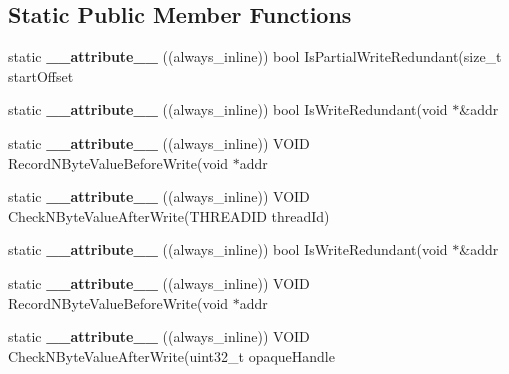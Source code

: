 \subsection*{Static Public Member Functions}
\begin{DoxyCompactItemize}
\item 
\hypertarget{structRedSpyAnalysis_acb8312eee9deb99291c4052fdbd66887}{static {\bfseries \-\_\-\-\_\-attribute\-\_\-\-\_\-} ((always\-\_\-inline)) bool Is\-Partial\-Write\-Redundant(size\-\_\-t start\-Offset}\label{structRedSpyAnalysis_acb8312eee9deb99291c4052fdbd66887}

\item 
\hypertarget{structRedSpyAnalysis_a7535fac0a0e053e60b39fa2f23b3701f}{static {\bfseries \-\_\-\-\_\-attribute\-\_\-\-\_\-} ((always\-\_\-inline)) bool Is\-Write\-Redundant(void $\ast$\&addr}\label{structRedSpyAnalysis_a7535fac0a0e053e60b39fa2f23b3701f}

\item 
\hypertarget{structRedSpyAnalysis_ad09b31fd6c23d44ab50798a11711fb1a}{static {\bfseries \-\_\-\-\_\-attribute\-\_\-\-\_\-} ((always\-\_\-inline)) V\-O\-I\-D Record\-N\-Byte\-Value\-Before\-Write(void $\ast$addr}\label{structRedSpyAnalysis_ad09b31fd6c23d44ab50798a11711fb1a}

\item 
\hypertarget{structRedSpyAnalysis_acd89ba949f9f73d9bba3bf8c0c057f90}{static {\bfseries \-\_\-\-\_\-attribute\-\_\-\-\_\-} ((always\-\_\-inline)) V\-O\-I\-D Check\-N\-Byte\-Value\-After\-Write(T\-H\-R\-E\-A\-D\-I\-D thread\-Id)}\label{structRedSpyAnalysis_acd89ba949f9f73d9bba3bf8c0c057f90}

\item 
\hypertarget{structRedSpyAnalysis_a7535fac0a0e053e60b39fa2f23b3701f}{static {\bfseries \-\_\-\-\_\-attribute\-\_\-\-\_\-} ((always\-\_\-inline)) bool Is\-Write\-Redundant(void $\ast$\&addr}\label{structRedSpyAnalysis_a7535fac0a0e053e60b39fa2f23b3701f}

\item 
\hypertarget{structRedSpyAnalysis_ad09b31fd6c23d44ab50798a11711fb1a}{static {\bfseries \-\_\-\-\_\-attribute\-\_\-\-\_\-} ((always\-\_\-inline)) V\-O\-I\-D Record\-N\-Byte\-Value\-Before\-Write(void $\ast$addr}\label{structRedSpyAnalysis_ad09b31fd6c23d44ab50798a11711fb1a}

\item 
\hypertarget{structRedSpyAnalysis_ab62f13b23858cc46ae34b668b71afe80}{static {\bfseries \-\_\-\-\_\-attribute\-\_\-\-\_\-} ((always\-\_\-inline)) V\-O\-I\-D Check\-N\-Byte\-Value\-After\-Write(uint32\-\_\-t opaque\-Handle}\label{structRedSpyAnalysis_ab62f13b23858cc46ae34b668b71afe80}


\end{DoxyCompactItemize}
